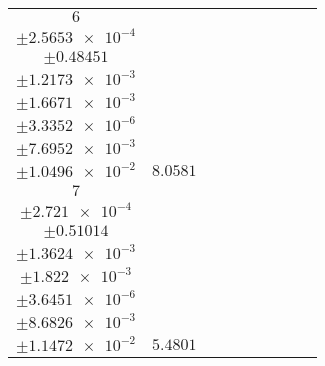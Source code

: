 \documentclass[8pt]{article}
\begin{document}
\begin{longtable}[l]{c c c c c c c c c}
$\num{6}$ & \begin{tabular}[c]{@{}c@{}}$\num{3.0267e-2}$ \\ $\pm\num{2.5653e-4}$\end{tabular} & \begin{tabular}[c]{@{}c@{}}$\num{1.0966}$ \\ $\pm\num{0.48451}$\end{tabular} & \begin{tabular}[c]{@{}c@{}}$\num{6.9231}$ \\ $\pm\num{1.2173e-3}$\end{tabular} & \begin{tabular}[c]{@{}c@{}}$\num{3.5544e+3}$ \\ $\pm\num{1.6671e-3}$\end{tabular} & \begin{tabular}[c]{@{}c@{}}$\num{7.1108}$ \\ $\pm\num{3.3352e-6}$\end{tabular} & \begin{tabular}[c]{@{}c@{}}$\num{0.71149}$ \\ $\pm\num{7.6952e-3}$\end{tabular} & \begin{tabular}[c]{@{}c@{}}$\num{0.76016}$ \\ $\pm\num{1.0496e-2}$\end{tabular} & $\num{8.0581}$\\
$\num{7}$ & \begin{tabular}[c]{@{}c@{}}$\num{3.0372e-2}$ \\ $\pm\num{2.721e-4}$\end{tabular} & \begin{tabular}[c]{@{}c@{}}$\num{0.17058}$ \\ $\pm\num{0.51014}$\end{tabular} & \begin{tabular}[c]{@{}c@{}}$\num{7.9078}$ \\ $\pm\num{1.3624e-3}$\end{tabular} & \begin{tabular}[c]{@{}c@{}}$\num{3.5554e+3}$ \\ $\pm\num{1.822e-3}$\end{tabular} & \begin{tabular}[c]{@{}c@{}}$\num{7.1127}$ \\ $\pm\num{3.6451e-6}$\end{tabular} & \begin{tabular}[c]{@{}c@{}}$\num{0.78339}$ \\ $\pm\num{8.6826e-3}$\end{tabular} & \begin{tabular}[c]{@{}c@{}}$\num{0.81833}$ \\ $\pm\num{1.1472e-2}$\end{tabular} & $\num{5.4801}$\\

\end{longtable}
\end{document}
